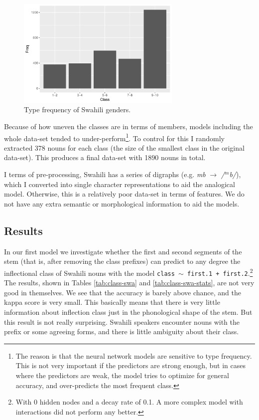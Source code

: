 \begin{figure}[!htpb]
  \centering
  \includegraphics[width=0.7\textwidth]{./figures/swahili/freq-plot.pdf}
  \caption{Type frequency of Swahili genders.}\label{fig:class-freq-swahili}
\end{figure}

Because of how uneven the classes are in terms of members, models including the whole data-set tended to under-perform\footnote{The reason is that the neural network models are sensitive to type frequency. This is not very important if the predictors are strong enough, but in cases where the predictors are weak, the model tries to optimize for general accuracy, and over-predicts the most frequent class.}. To control for this I randomly extracted 378 nouns for each class (the size of the smallest class in the original data-set). This produces a final data-set with 1890 nouns in total.

I terms of pre-processing, Swahili has a series of digraphs (e.g. \textit{mb} $\rightarrow$ \textit{/$^m$b/}), which I converted into single character representations to aid the analogical model. Otherwise, this is a relatively poor data-set in terms of features. We do not have any extra semantic or morphological information to aid the models.

\subsection{Results}

In our first model we investigate whether the first and second segments of the stem (that is, after removing the class prefixes) can predict to any degree the inflectional class of Swahili nouns with the model \texttt{class $\sim$ first.1 + first.2}.\footnote{With 0 hidden nodes and a decay rate of 0.1. A more complex model with interactions did not perform any better.} The results, shown in Tables \ref{tab:class-swa} and \ref{tab:class-swa-stats}, are not very good in themselves. We see that the accuracy is barely above chance, and the kappa score is very small. This basically means that there is very little information about inflection class just in the phonological shape of the stem. But this result is not really surprising. Swahili speakers encounter nouns with the prefix or some agreeing forms, and there is little ambiguity about their class.

